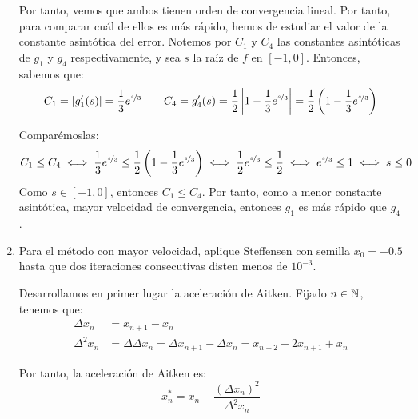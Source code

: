 \begin{ejercicio}
\begin{enumerate}
        Por tanto, vemos que ambos tienen orden de convergencia lineal. Por tanto, para comparar cuál de ellos es más rápido, hemos de estudiar el valor de la constante asintótica del error. Notemos por $C_1$ y $C_4$ las constantes asintóticas de $g_1$ y $g_4$ respectivamente, y sea $s$ la raíz de $f$ en $[-1,0]$. Entonces, sabemos que:
        \begin{align*}
            C_1 = |g_1'(s)| = \dfrac{1}{3}e^{\nicefrac{s}{3}}\qquad C_4 = g_4'(s) = \dfrac{1}{2}\left|1-\dfrac{1}{3}e^{\nicefrac{s}{3}}\right|= \dfrac{1}{2}\left(1-\dfrac{1}{3}e^{\nicefrac{s}{3}}\right)
        \end{align*} 

        Comparémoslas:
        \begin{align*}
            C_1\leq C_4\iff \dfrac{1}{3}e^{\nicefrac{s}{3}}\leq \dfrac{1}{2}\left(1-\dfrac{1}{3}e^{\nicefrac{s}{3}}\right)\iff \dfrac{1}{2}e^{\nicefrac{s}{3}}\leq \dfrac{1}{2}\iff e^{\nicefrac{s}{3}}\leq 1\iff s\leq 0
        \end{align*}
        Como $s\in [-1,0]$, entonces $C_1\leq C_4$. Por tanto, como a menor constante asintótica, mayor velocidad de convergencia, entonces $g_1$ es más rápido que $g_4$.
        \item Para el método con mayor velocidad, aplique Steffensen con semilla $x_0 = -0.5$ hasta que dos iteraciones consecutivas disten menos de $10^{-3}$.
        
        Desarrollamos en primer lugar la aceleración de Aitken. Fijado $n\in \mathbb{N}$, tenemos que:
        \begin{align*}
            \Delta x_n &= x_{n+1}-x_n\\
            \Delta^2 x_n &= \Delta \Delta x_n = \Delta x_{n+1}-\Delta x_n = x_{n+2}-2x_{n+1}+x_n
        \end{align*}

        Por tanto, la aceleración de Aitken es:
        \begin{equation*}
            x_{n}^* = x_n - \dfrac{(\Delta x_n)^2}{\Delta^2 x_n}
        \end{equation*}


\end{enumerate}
\end{ejercicio}
